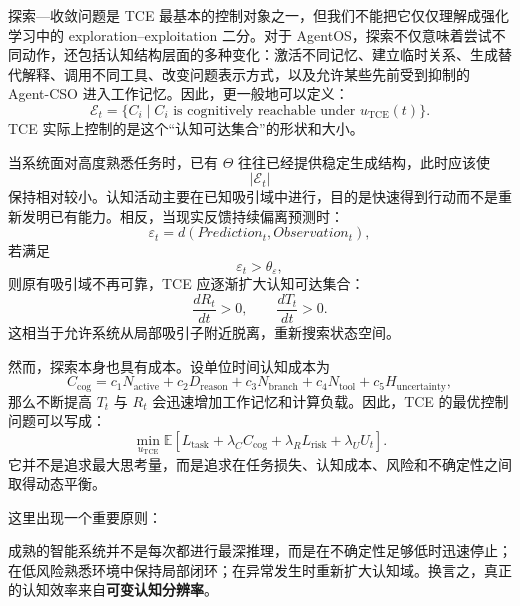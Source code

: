 探索—收敛问题是 TCE 最基本的控制对象之一，但我们不能把它仅仅理解成强化学习中的 exploration--exploitation 二分。对于 AgentOS，探索不仅意味着尝试不同动作，还包括认知结构层面的多种变化：激活不同记忆、建立临时关系、生成替代解释、调用不同工具、改变问题表示方式，以及允许某些先前受到抑制的 Agent-CSO 进入工作记忆。因此，更一般地可以定义：
\begin{equation}
    \mathcal E_t
    =
    \{
    C_i
    \mid
    C_i
    \text{ is cognitively reachable under }u_{\mathrm{TCE}}(t)
    \}.
\end{equation}
TCE 实际上控制的是这个“认知可达集合”的形状和大小。

当系统面对高度熟悉任务时，已有 $\Theta$ 往往已经提供稳定生成结构，此时应该使
\begin{equation}
    |\mathcal E_t|
\end{equation}
保持相对较小。认知活动主要在已知吸引域中进行，目的是快速得到行动而不是重新发明已有能力。相反，当现实反馈持续偏离预测时：
\begin{equation}
    \varepsilon_t
    =
    d(
    Prediction_t,
    Observation_t
    ),
\end{equation}
若满足
\begin{equation}
    \varepsilon_t>\theta_\varepsilon,
\end{equation}
则原有吸引域不再可靠，TCE 应逐渐扩大认知可达集合：
\begin{equation}
    \frac{dR_t}{dt}>0,
    \qquad
    \frac{dT_t}{dt}>0.
\end{equation}
这相当于允许系统从局部吸引子附近脱离，重新搜索状态空间。

然而，探索本身也具有成本。设单位时间认知成本为
\begin{equation}
    C_{\mathrm{cog}}
    =
    c_1N_{\mathrm{active}}
    +
    c_2D_{\mathrm{reason}}
    +
    c_3N_{\mathrm{branch}}
    +
    c_4N_{\mathrm{tool}}
    +
    c_5H_{\mathrm{uncertainty}},
\end{equation}
那么不断提高 $T_t$ 与 $R_t$ 会迅速增加工作记忆和计算负载。因此，TCE 的最优控制问题可以写成：
\begin{equation}
    \min_{u_{\mathrm{TCE}}}
    \mathbb E
    \left[
    L_{\mathrm{task}}
    +
    \lambda_C C_{\mathrm{cog}}
    +
    \lambda_R L_{\mathrm{risk}}
    +
    \lambda_U U_t
    \right].
\end{equation}
它并不是追求最大思考量，而是追求在任务损失、认知成本、风险和不确定性之间取得动态平衡。

这里出现一个重要原则：
\begin{statementbox}
\centering
{}
\end{statementbox}
成熟的智能系统并不是每次都进行最深推理，而是在不确定性足够低时迅速停止；在低风险熟悉环境中保持局部闭环；在异常发生时重新扩大认知域。换言之，真正的认知效率来自\textbf{可变认知分辨率}。


